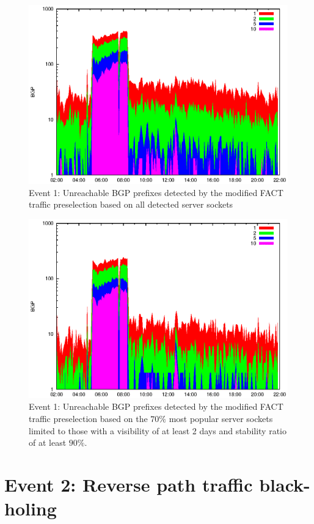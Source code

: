 \begin{figure}
	[p] \centering 
	\includegraphics[width=0.75\linewidth]{images/events/2010_03_25/bgp_log_all_external.eps}
	\caption{Event 1: Unreachable BGP prefixes detected by the modified FACT traffic preselection based on all detected server sockets} 
	\label{fig:AMS_IX_FACT_allSES} 
\end{figure}

\begin{figure}
	[p] \centering 
	\includegraphics[width=0.75\linewidth]{images/events/2010_03_25/bgp_log_Set_var_0_1_stab_9_vts_2.eps}
	\caption{Event 1: Unreachable BGP prefixes detected by the modified FACT traffic preselection based on the $70\%$ most popular server sockets limited to those with a visibility of at least 2 days and stability ratio of at least $90\%$.} 
	\label{fig:AMS_IX_FACT_popularVTS2STAB9} 
\end{figure}


\newpage
\section{Event 2: Reverse path traffic black-holing}

